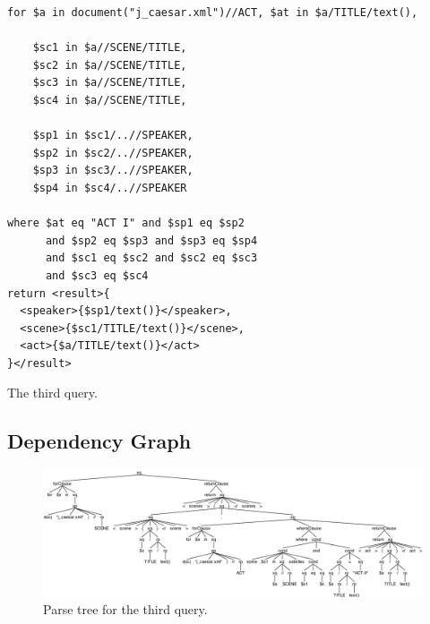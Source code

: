 \documentclass{article}
\begin{document}
\begin{listing}[H]
\begin{verbatim}
for $a in document("j_caesar.xml")//ACT, $at in $a/TITLE/text(),

    $sc1 in $a//SCENE/TITLE,
    $sc2 in $a//SCENE/TITLE,
    $sc3 in $a//SCENE/TITLE,
    $sc4 in $a//SCENE/TITLE,

    $sp1 in $sc1/..//SPEAKER,
    $sp2 in $sc2/..//SPEAKER,
    $sp3 in $sc3/..//SPEAKER,
    $sp4 in $sc4/..//SPEAKER

where $at eq "ACT I" and $sp1 eq $sp2 
      and $sp2 eq $sp3 and $sp3 eq $sp4 
      and $sc1 eq $sc2 and $sc2 eq $sc3 
      and $sc3 eq $sc4
return <result>{
  <speaker>{$sp1/text()}</speaker>,
  <scene>{$sc1/TITLE/text()}</scene>,
  <act>{$a/TITLE/text()}</act>
}</result>
\end{verbatim}
\caption{The third query.}\label{lst:query3}
\end{listing}

\subsection{Dependency Graph}
\begin{figure}[H]
  \centering
  \includegraphics[width=\linewidth]{imgs/antlr4_parse_tree_query_3.png}
  \caption{Parse tree for the third query.}\label{fig:parseTree3}
\end{figure}
\end{document}
